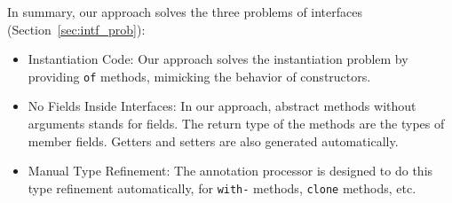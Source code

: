 In summary, our approach solves the three problems of interfaces
(Section~\ref{sec:intf_prob}):
\begin{itemize}
\item Instantiation Code: Our approach solves the instantiation problem by
  providing \texttt{of} methods, mimicking the behavior of constructors.
\item No Fields Inside Interfaces: In our approach, abstract methods without
  arguments stands for fields. The return type of the methods are the types of
  member fields. Getters and setters are also generated automatically.
\item Manual Type Refinement: The annotation processor is designed to do this
  type refinement automatically, for \texttt{with-} methods, \texttt{clone}
  methods, etc.
\end{itemize}
